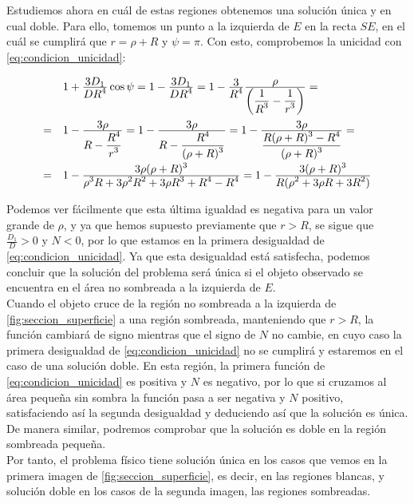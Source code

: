 \documentclass[11pt]{book}
\newcommand\ddfrac[2]{\frac{\displaystyle #1}{\displaystyle #2}}
\begin{document}
Estudiemos ahora en cuál de estas regiones obtenemos una solución única y en cual doble. Para ello, tomemos un punto a la izquierda de $E$ en la recta $SE$, en el cuál se cumplirá que $r=\rho+R$ y $\psi=\pi$. Con esto, comprobemos la unicidad con \eqref{eq:condicion_unicidad}:
\[
\def\arraystretch{2}
\begin{array}{ll}
  & 1+\ddfrac{3D_1}{DR^4}\cos{\psi} = 1-\ddfrac{3D_1}{DR^4} = 1-\ddfrac{3}{R^4}\ddfrac{\rho}{\left(\ddfrac{1}{R^3}-\ddfrac{1}{r^3}\right)} = \\
= & 1-\ddfrac{3\rho}{R-\ddfrac{R^4}{r^3}} = 1-\ddfrac{3\rho}{R-\ddfrac{R^4}{(\rho+R)^3}} = 1-\ddfrac{3\rho}{\ddfrac{R(\rho+R)^3-R^4}{(\rho+R)^3}} = \\
= & 1-\ddfrac{3\rho(\rho+R)^3}{\rho^3R+3\rho^2R^2+3\rho R^3+R^4-R^4} = 1-\ddfrac{3(\rho+R)^3}{R(\rho^2+3\rho R+3R^2)}
\end{array}
\]

Podemos ver fácilmente que esta última igualdad es negativa para un valor grande de $\rho$, y ya que hemos supuesto previamente que $r>R$, se sigue que $\ddfrac{D_1}{D}>0$ y $N<0$, por lo que estamos en la primera desigualdad de \eqref{eq:condicion_unicidad}. Ya que esta desigualdad está satisfecha, podemos concluir que la solución del problema será única si el objeto observado se encuentra en el área no sombreada a la izquierda de $E$.\\

Cuando el objeto cruce de la región no sombreada a la izquierda de \ref{fig:seccion_superficie} a una región sombreada, manteniendo que $r>R$, la función cambiará de signo mientras que el signo de $N$ no cambie, en cuyo caso la primera desigualdad de \eqref{eq:condicion_unicidad} no se cumplirá y estaremos en el caso de una solución doble. En esta región, la primera función de \eqref{eq:condicion_unicidad} es positiva y $N$ es negativo, por lo que si cruzamos al área pequeña sin sombra la función pasa a ser negativa y $N$ positivo, satisfaciendo así la segunda desigualdad y deduciendo así que la solución es única. De manera similar, podremos comprobar que la solución es doble en la región sombreada pequeña.\\

Por tanto, el problema físico tiene solución única en los casos que vemos en la primera imagen de \ref{fig:seccion_superficie}, es decir, en las regiones blancas, y solución doble en los casos de la segunda imagen, las regiones sombreadas.\\
\end{document}

